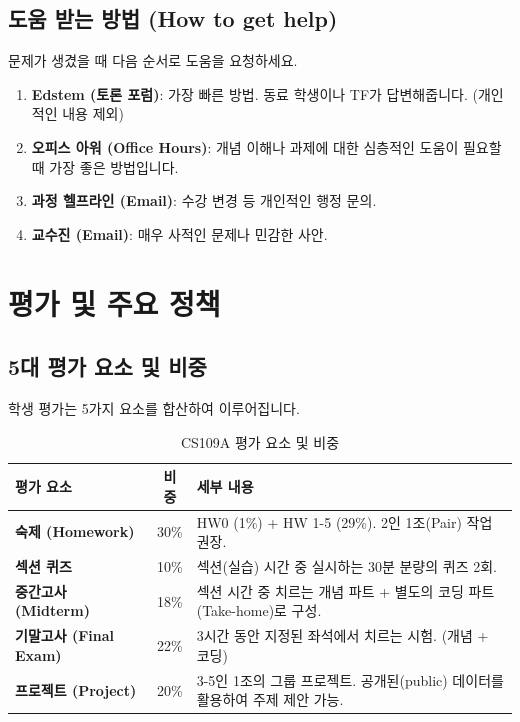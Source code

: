 \documentclass[11pt,a4paper]{book}
\theoremstyle{definition}
\begin{document}
\subsection{도움 받는 방법 (How to get help)}
문제가 생겼을 때 다음 순서로 도움을 요청하세요.

\begin{enumerate}
    \item \textbf{Edstem (토론 포럼)}: 가장 빠른 방법. 동료 학생이나 TF가 답변해줍니다. (개인적인 내용 제외)
    \item \textbf{오피스 아워 (Office Hours)}: 개념 이해나 과제에 대한 심층적인 도움이 필요할 때 가장 좋은 방법입니다.
    \item \textbf{과정 헬프라인 (Email)}: 수강 변경 등 개인적인 행정 문의.
    \item \textbf{교수진 (Email)}: 매우 사적인 문제나 민감한 사안.
\end{enumerate}


\section{평가 및 주요 정책}

\subsection{5대 평가 요소 및 비중}
학생 평가는 5가지 요소를 합산하여 이루어집니다.

\begin{table}[h!]
  \centering
  \caption{CS109A 평가 요소 및 비중}
  \label{tab:grading}
  \begin{tabular}{l c p{10cm}}
    \toprule
    \textbf{평가 요소} & \textbf{비중} & \textbf{세부 내용} \\
    \midrule
    \textbf{숙제 (Homework)} & 30\% & HW0 (1\%) + HW 1-5 (29\%). \newline 2인 1조(Pair) 작업 권장. \\
    \textbf{섹션 퀴즈} & 10\% & 섹션(실습) 시간 중 실시하는 30분 분량의 퀴즈 2회. \\
    \textbf{중간고사 (Midterm)} & 18\% & 섹션 시간 중 치르는 개념 파트 + 별도의 코딩 파트(Take-home)로 구성. \\
    \textbf{기말고사 (Final Exam)} & 22\% & 3시간 동안 지정된 좌석에서 치르는 시험. (개념 + 코딩) \\
    \textbf{프로젝트 (Project)} & 20\% & 3-5인 1조의 그룹 프로젝트. 공개된(public) 데이터를 활용하여 주제 제안 가능. \\
    \bottomrule
  \end{tabular}
\end{table}
\end{document}

